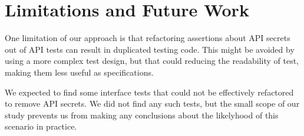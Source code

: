 \section{Limitations and Future Work}
One limitation of our approach is that refactoring assertions about
API secrets out of API tests can result in duplicated testing
code. This might be avoided by using a more complex test design, but
that could reducing the readability of test, making them less useful
as specifications.

We expected to find some interface tests that could not be effectively
refactored to remove API secrets. We did not find any such tests, but
the small scope of our study prevents us from making any conclusions
about the likelyhood of this scenario in practice. 
